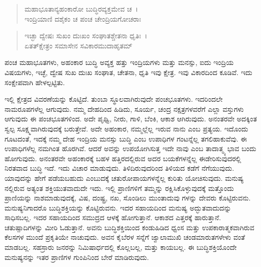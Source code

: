 \begin{verse}
ಮಹಾಭೂತಾನ್ಯಹಂಕಾರೋ ಬುದ್ಧಿರವ್ಯಕ್ತಮೇವ ಚ~।\\ಇಂದ್ರಿಯಾಣಿ ದಶೈಕಂ ಚ ಪಂಚ ಚೇಂದ್ರಿಯಗೋಚರಾಃ 
\end{verse}

\begin{verse}
ಇಚ್ಛಾ ದ್ವೇಷಃ ಸುಖಂ ದುಃಖಂ ಸಂಘಾತಶ್ಚೇತನಾ ಧೃತಿಃ~।\\ಏತತ್​ಕ್ಷೇತ್ರಂ ಸಮಾಸೇನ ಸವಿಕಾರಮುದಾಹೃತಮ್ 
\end{verse}

{\small ಪಂಚ ಮಹಾಭೂತಗಳು, ಅಹಂಕಾರ ಬುದ್ಧಿ ಅವ್ಯಕ್ತ ಹತ್ತು ಇಂದ್ರಿಯಗಳು ಮತ್ತು ಮನಸ್ಸು, ಐದು ಇಂದ್ರಿಯ ವಿಷಯಗಳು, ಇಚ್ಛೆ, ದ್ವೇಷ ಸುಖ ದುಃಖ ಸಂಘಾತ, ಚೇತನಾ, ಧೃತಿ ಇವು ಕ್ಷೇತ್ರ. ಇವು ವಿಕಾರದಿಂದ ಕೂಡಿವೆ. ಇದು ಸಂಕ್ಷೇಪವಾಗಿ ಹೇಳಲ್ಪಟ್ಟಿತು.}

ಇಲ್ಲಿ ಕ್ಷೇತ್ರದ ವಿವರಣೆಯನ್ನು ಕೊಟ್ಟಿದೆ. ತುಂಬಾ ಸ್ಥೂಲವಾಗಿರುವುದೇ ಪಂಚಭೂತಗಳು. ಇದರಿಂದಲೇ ನಾಮರೂಪಗಳೆಲ್ಲ ಆಗುವುದು. ನಮ್ಮ ದೇಹದಿಂದ ಹಿಡಿದು, ಸೂರ್ಯ, ಚಂದ್ರ ನಕ್ಷತ್ರಗಳವರೆಗೆ ಎಲ್ಲಾ ವಸ್ತುಗಳು ಆಗುವುದು ಈ ಪಂಚಭೂತಗಳಿಂದ. ಅದೇ ಪೃಥ್ವಿ, ನೀರು, ಗಾಳಿ, ಬೆಂಕಿ, ಆಕಾಶ ಆಗಿರುವುದು. ಅನಂತರವೇ ಅದಕ್ಕಿಂತ ಸ್ವಲ್ಪ ಸೂಕ್ಷ್ಮವಾಗಿರುವುದಕ್ಕೆ ಬರುತ್ತೇವೆ. ಅದೇ ಅಹಂಕಾರ, ನಮ್ಮಲ್ಲೆಲ್ಲ ಇರುವ ನಾನು ಎಂಬ ಪ್ರತ್ಯಯ. ಇದೊಂದು ಗೂಟದಂತೆ, ಇದಕ್ಕೆ ನಮ್ಮ ದೇಹ ಇಂದ್ರಿಯ ಮನಸ್ಸು ಬುದ್ಧಿ ಎಂಬ ಉಪಾಧಿಗಳ ಗಂಟನ್ನೆಲ್ಲ ತಗಲಿಹಾಕುವೆವು. ಈ ಉಪಾಧಿಗಳೆಲ್ಲ ನಮಗಿಂತ ಹೊರಗಿವೆ. ಆದರೆ ಅವನ್ನು ಉಪಯೋಗಿಸುತ್ತ ಇದೇ ನಾವು ಎಂಬ ತಾದಾತ್ಮ್ಯ ಭಾವ ಬಂದು ಹೋಗುವುದು. ಅನಂತರವೇ ಅಹಂಕಾರಕ್ಕೆ ಬಹಳ ಹತ್ತಿರದಲ್ಲಿರುವ ಅದರ ಬಯಕೆಗಳನ್ನೆಲ್ಲ ಈಡೇರಿಸುವುದರಲ್ಲಿ ನಿರತವಾದ ಬುದ್ಧಿ ಇದೆ. ಇದು ವಿಚಾರ ಮಾಡುವುದು. ತಿಳಿದಿರುವುದರಿಂದ ತಿಳಿಯದ ಕಡೆಗೆ ನೆಗೆಯುವುದು. ಯಾವುದನ್ನು ಹೇಗೆ ಪಡೆಯಬಹುದು ಎಂಬುದಕ್ಕೆ ಚತುರೋಪಾಯಗಳನ್ನೆಲ್ಲ ಕುರಿತು ಯೋಚಿಸುವುದು. ಮನುಷ್ಯ ನಲ್ಲಿರುವ ಅತ್ಯಂತ ಶಕ್ತಿಯುತವಾದುದೇ ಇದು. ಇಲ್ಲಿ ಪ್ರಾಣಿಗಳಿಗೆ ತಮ್ಮನ್ನು ರಕ್ಷಿಸಿಕೊಳ್ಳುವುದಕ್ಕೆ ಮತ್ತೊಂದು ಪ್ರಾಣಿಯನ್ನು ನಾಶಮಾಡುವುದಕ್ಕೆ, ವಿಷ, ದಂಷ್ಟ್ರ, ನಖ, ಸೊಂಡಿಲು ಮುಂತಾದುವು ಗಳನ್ನು ದೇವರು ಕೊಟ್ಟಿರುವನು. ಮನುಷ್ಯನಿಗಾದರೊ ಬುದ್ಧಿಶಕ್ತಿಯನ್ನು ಕೊಟ್ಟಿರುವನು. ಇದರ ಸಹಾಯದಿಂದ ಮನುಷ್ಯ ಅದ್ಭುತವಾದುದನ್ನು ಸಾಧಿಸಬಲ್ಲ. ಇದರ ಸಹಾಯದಿಂದ ಸಮುದ್ರದ ಆಳಕ್ಕೆ ಹೋಗುತ್ತಾನೆ. ಆಕಾಶದ ಎತ್ತರಕ್ಕೆ ಹಾರುತ್ತಾನೆ. ಚತುಷ್ಪಾದಿಗಳನ್ನು ಮೀರಿ ಓಡುತ್ತಾನೆ. ಅವನು ಬುದ್ಧಿಶಕ್ತಿಯಿಂದ ಕಂಡುಹಿಡಿದ ಧ್ವಂಸ ಮತ್ತು ಉಪಕಾರಾತ್ಮಕವಾಗಿರುವ ಕೆಲಸಗಳ ಮುಂದೆ ಪ್ರಕೃತಿಯೇ ನಾಚುವುದು. ಅವನ ಕೈಬೆರಳ ಸನ್ನೆಗೆ ಜ್ವಾಲಾಮುಖಿ ಚಂಡಮಾರುತಗಳೇಳು ವಂತೆ ಮಾಡಬಲ್ಲ. ಸಹಸ್ರಾರು ಜನರನ್ನು ನಿಮಿಷಾರ್ಧದಲ್ಲಿ ಕೊಲ್ಲಬಲ್ಲ, ಮತ್ತು ಕಾಯಬಲ್ಲ. ಈ ಬುದ್ಧಿಶಕ್ತಿಯೊಂದೇ ಮನುಷ್ಯನನ್ನು ಇತರ ಪ್ರಾಣಿಗಳ ಗುಂಪಿನಿಂದ ಬೇರೆ ಮಾಡಿರುವುದು.\enginline{}


